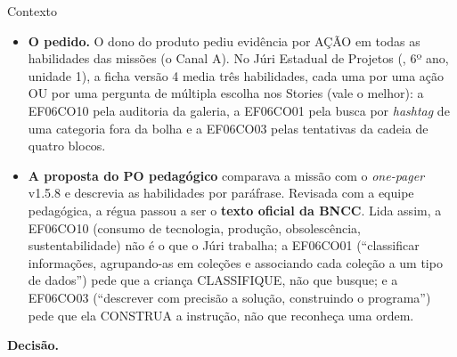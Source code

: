 \begin{especificacao}{Contexto}
\begin{itemize}
  \item \textbf{O pedido.} O dono do produto pediu evidência por AÇÃO em todas
    as habilidades das missões (o Canal A). No Júri Estadual de Projetos
    (, 6º ano, unidade 1), a ficha versão 4 media três
    habilidades, cada uma por uma ação OU por uma pergunta de múltipla escolha
    nos Stories (vale o melhor): a EF06CO10 pela auditoria da galeria, a
    EF06CO01 pela busca por \emph{hashtag} de uma categoria fora da bolha e a
    EF06CO03 pelas tentativas da cadeia de quatro blocos.
  \item \textbf{A proposta do PO pedagógico} comparava a missão com o
    \emph{one-pager} v1.5.8 e descrevia as habilidades por paráfrase. Revisada
    com a equipe pedagógica, a régua passou a ser o \textbf{texto oficial da
    BNCC}. Lida assim, a EF06CO10 (consumo de tecnologia, produção,
    obsolescência, sustentabilidade) não é o que o Júri trabalha; a EF06CO01
    (\enquote{classificar informações, agrupando-as em coleções e associando
    cada coleção a um tipo de dados}) pede que a criança CLASSIFIQUE, não que
    busque; e a EF06CO03 (\enquote{descrever com precisão a solução,
    construindo o programa}) pede que ela CONSTRUA a instrução, não que
    reconheça uma ordem.
\end{itemize}
\end{especificacao}

\textbf{Decisão.}

